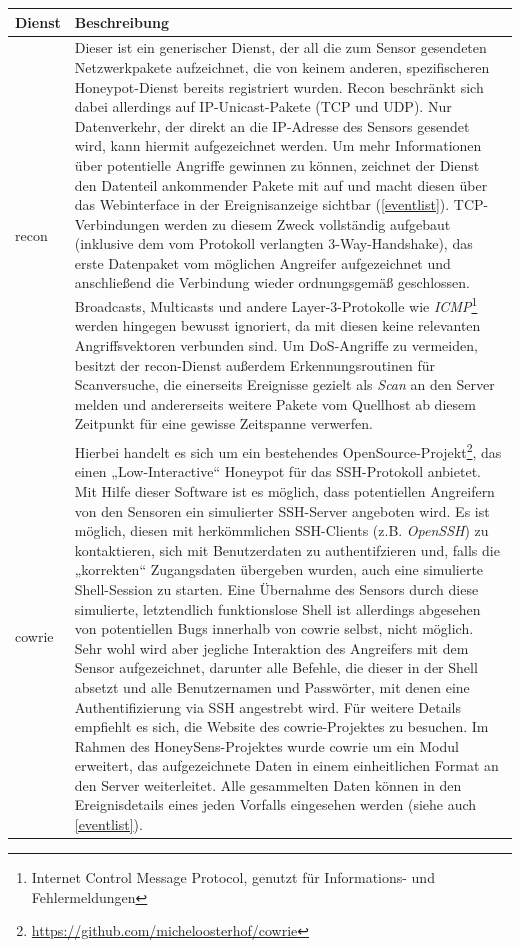\documentclass[12pt]{article}
\begin{document}
\begin{longtable}[h]{|l|l|}
	\hline
	\textbf{Dienst} & \textbf{Beschreibung}\\\hline
	recon & \begin{minipage}[h]{0.85\linewidth}\vspace{0.5\baselineskip}
				Dieser ist ein generischer Dienst, der all die zum Sensor gesendeten Netzwerkpakete aufzeichnet, die von keinem anderen, spezifischeren Honeypot-Dienst bereits registriert wurden. Recon beschränkt sich dabei allerdings auf IP-Unicast-Pakete (TCP und UDP). Nur Datenverkehr, der direkt an die IP-Adresse des Sensors gesendet wird, kann hiermit aufgezeichnet werden. Um mehr Informationen über potentielle Angriffe gewinnen zu können, zeichnet der Dienst den Datenteil ankommender Pakete mit auf und macht diesen über das Webinterface in der Ereignisanzeige sichtbar (\ref{eventlist}). TCP-Verbindungen werden zu diesem Zweck vollständig aufgebaut (inklusive dem vom Protokoll verlangten 3-Way-Handshake), das erste Datenpaket vom möglichen Angreifer aufgezeichnet und anschließend die Verbindung wieder ordnungsgemäß geschlossen. Broadcasts, Multicasts und andere Layer-3-Protokolle wie \textit{ICMP}\footnote{Internet Control Message Protocol, genutzt für Informations- und Fehlermeldungen} werden hingegen bewusst ignoriert, da mit diesen keine relevanten Angriffsvektoren verbunden sind. Um DoS-Angriffe zu vermeiden, besitzt der recon-Dienst außerdem Erkennungsroutinen für Scanversuche, die einerseits Ereignisse gezielt als \textit{Scan} an den Server melden und andererseits weitere Pakete vom Quellhost ab diesem Zeitpunkt für eine gewisse Zeitspanne verwerfen.
					\vspace{0.5\baselineskip}\end{minipage}\\\hline
	cowrie & \begin{minipage}[h]{0.85\linewidth}\vspace{0.5\baselineskip}
				Hierbei handelt es sich um ein bestehendes OpenSource-Projekt\footnote{\url{https://github.com/micheloosterhof/cowrie}}, das einen „Low-Interactive“ Honeypot für das SSH-Protokoll anbietet. Mit Hilfe dieser Software ist es möglich, dass potentiellen Angreifern von den Sensoren ein simulierter SSH-Server angeboten wird. Es ist möglich, diesen mit herkömmlichen SSH-Clients (z.B. \textit{OpenSSH}) zu kontaktieren, sich mit Benutzerdaten zu authentifzieren und, falls die „korrekten“ Zugangsdaten übergeben wurden, auch eine simulierte Shell-Session zu starten. Eine Übernahme des Sensors durch diese simulierte, letztendlich funktionslose Shell ist allerdings abgesehen von potentiellen Bugs innerhalb von cowrie selbst, nicht möglich. Sehr wohl wird aber jegliche Interaktion des Angreifers mit dem Sensor aufgezeichnet, darunter alle Befehle, die dieser in der Shell absetzt und alle Benutzernamen und Passwörter, mit denen eine Authentifizierung via SSH angestrebt wird. Für weitere Details empfiehlt es sich, die Website des cowrie-Projektes zu besuchen. Im Rahmen des HoneySens-Projektes wurde cowrie um ein Modul erweitert, das aufgezeichnete Daten in einem einheitlichen Format an den Server weiterleitet. Alle gesammelten Daten können in den Ereignisdetails eines jeden Vorfalls eingesehen werden (siehe auch \ref{eventlist}).

\end{minipage}
\end{longtable}
\end{document}
